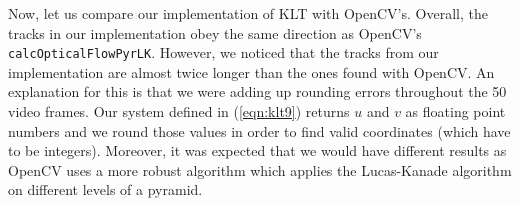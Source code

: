 \documentclass[]{IEEEtran}
\begin{document}
Now, let us compare our implementation of KLT with OpenCV's. Overall, the tracks in our implementation obey the same direction as OpenCV's \texttt{calcOpticalFlowPyrLK}. However, we noticed that the tracks from our implementation are almost twice longer than the ones found with OpenCV. An explanation for this is that we were adding up rounding errors throughout the 50 video frames. Our system defined in (\ref{eqn:klt9}) returns $u$ and $v$ as floating point numbers and we round those values in order to find valid coordinates (which have to be integers). Moreover, it was expected that we would have different results as OpenCV uses a more robust algorithm which applies the Lucas-Kanade algorithm on different levels of a pyramid.





\end{document}

